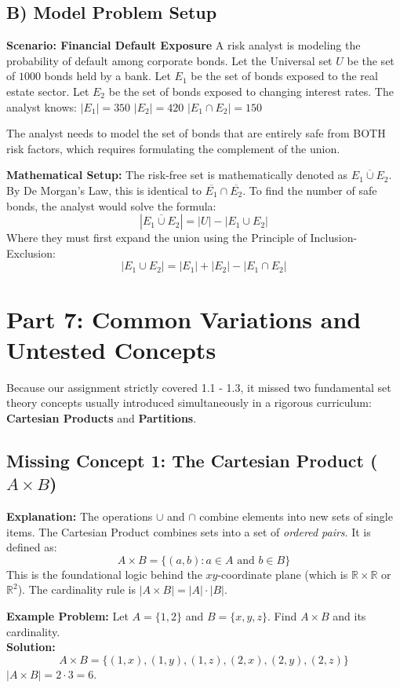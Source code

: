 \documentclass[12pt]{article}
\begin{document}
\subsection{B) Model Problem Setup}
\textbf{Scenario: Financial Default Exposure}
A risk analyst is modeling the probability of default among corporate bonds. 
Let the Universal set $U$ be the set of $1000$ bonds held by a bank.
Let $E_1$ be the set of bonds exposed to the real estate sector.
Let $E_2$ be the set of bonds exposed to changing interest rates.
The analyst knows:
$|E_1| = 350$
$|E_2| = 420$
$|E_1 \cap E_2| = 150$

The analyst needs to model the set of bonds that are entirely safe from BOTH risk factors, which requires formulating the complement of the union.

\textbf{Mathematical Setup:}
The risk-free set is mathematically denoted as $\overline{E_1 \cup E_2}$.
By De Morgan's Law, this is identical to $\overline{E_1} \cap \overline{E_2}$.
To find the number of safe bonds, the analyst would solve the formula:
\[ |\overline{E_1 \cup E_2}| = |U| - |E_1 \cup E_2| \]
Where they must first expand the union using the Principle of Inclusion-Exclusion:
\[ |E_1 \cup E_2| = |E_1| + |E_2| - |E_1 \cap E_2| \]

\newpage
\section{Part 7: Common Variations and Untested Concepts}

Because our assignment strictly covered 1.1 - 1.3, it missed two fundamental set theory concepts usually introduced simultaneously in a rigorous curriculum: \textbf{Cartesian Products} and \textbf{Partitions}. 

\subsection{Missing Concept 1: The Cartesian Product ($A \times B$)}
\textbf{Explanation:} The operations $\cup$ and $\cap$ combine elements into new sets of single items. The Cartesian Product combines sets into a set of \textit{ordered pairs}. It is defined as:
\[ A \times B = \{(a, b) : a \in A \text{ and } b \in B\} \]
This is the foundational logic behind the $xy$-coordinate plane (which is $\mathbb{R} \times \mathbb{R}$ or $\mathbb{R}^2$). The cardinality rule is $|A \times B| = |A| \cdot |B|$.

\textbf{Example Problem:} Let $A = \{1, 2\}$ and $B = \{x, y, z\}$. Find $A \times B$ and its cardinality. \\
\textbf{Solution:} 
\[ A \times B = \{(1, x), (1, y), (1, z), (2, x), (2, y), (2, z)\} \]
$|A \times B| = 2 \cdot 3 = 6$.
\end{document}

